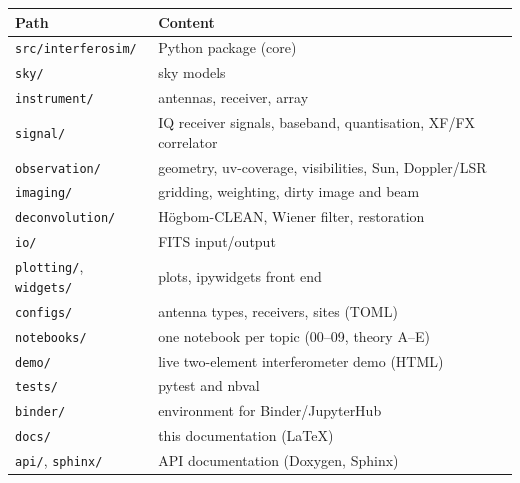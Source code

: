 
\begin{tabular}{@{}ll@{}}
\toprule
\textbf{Path} & \textbf{Content} \\
\midrule
\texttt{src/interferosim/} & Python package (core) \\
\texttt{\quad sky/} & sky models \\
\texttt{\quad instrument/} & antennas, receiver, array \\
\texttt{\quad signal/} & IQ receiver signals, baseband, quantisation, XF/FX correlator \\
\texttt{\quad observation/} & geometry, uv-coverage, visibilities, Sun, Doppler/LSR \\
\texttt{\quad imaging/} & gridding, weighting, dirty image and beam \\
\texttt{\quad deconvolution/} & H\"ogbom-CLEAN, Wiener filter, restoration \\
\texttt{\quad io/} & FITS input/output \\
\texttt{\quad plotting/}, \texttt{widgets/} & plots, ipywidgets front end \\
\texttt{configs/} & antenna types, receivers, sites (TOML) \\
\texttt{notebooks/} & one notebook per topic (00--09, theory A--E) \\
\texttt{demo/} & live two-element interferometer demo (HTML) \\
\texttt{tests/} & pytest and nbval \\
\texttt{binder/} & environment for Binder/JupyterHub \\
\texttt{docs/} & this documentation (\LaTeX) \\
\texttt{\quad api/}, \texttt{sphinx/} & API documentation (Doxygen, Sphinx) \\
\bottomrule
\end{tabular}
